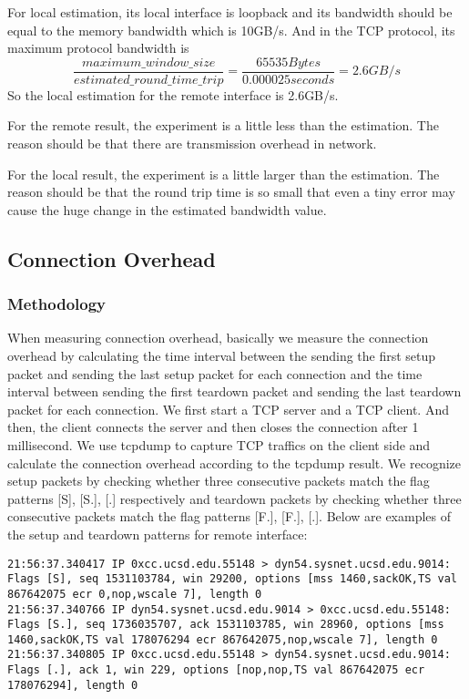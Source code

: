 For local estimation, its local interface is loopback and its bandwidth should be equal to the memory bandwidth which is 10GB/s. And in the TCP protocol, its maximum protocol bandwidth is $$\frac{maximum\_window\_size}{estimated\_round\_time\_trip} = \frac{65535 Bytes}{0.000025 seconds} = 2.6GB/s$$So the local estimation for the remote interface is 2.6GB/s.

For the remote result, the experiment is a little less than the estimation. The reason should be that there are transmission overhead in network.

For the local result, the experiment is a little larger than the estimation. The reason should be that the round trip time is so small that even a tiny error may cause the huge change in the estimated bandwidth value.

\subsection{Connection Overhead}

\subsubsection{Methodology}
When measuring connection overhead, basically we measure the connection overhead by calculating the time interval between the sending the first setup packet and sending the last setup packet for each connection and the time interval between sending the first teardown packet and sending the last teardown packet for each connection. We first start a TCP server and a TCP client. And then, the client connects the server and then closes the connection after 1 millisecond. We use tcpdump to capture TCP traffics on the client side and calculate the connection overhead according to the tcpdump result.  We recognize setup packets by checking whether three consecutive packets match the flag patterns [S], [S.], [.] respectively and teardown packets by checking whether three consecutive packets match the flag patterns [F.], [F.], [.]. Below are examples of the setup and teardown patterns for remote interface:

\begin{lstlisting}
21:56:37.340417 IP 0xcc.ucsd.edu.55148 > dyn54.sysnet.ucsd.edu.9014: Flags [S], seq 1531103784, win 29200, options [mss 1460,sackOK,TS val 867642075 ecr 0,nop,wscale 7], length 0
21:56:37.340766 IP dyn54.sysnet.ucsd.edu.9014 > 0xcc.ucsd.edu.55148: Flags [S.], seq 1736035707, ack 1531103785, win 28960, options [mss 1460,sackOK,TS val 178076294 ecr 867642075,nop,wscale 7], length 0
21:56:37.340805 IP 0xcc.ucsd.edu.55148 > dyn54.sysnet.ucsd.edu.9014: Flags [.], ack 1, win 229, options [nop,nop,TS val 867642075 ecr 178076294], length 0
\end{lstlisting}

